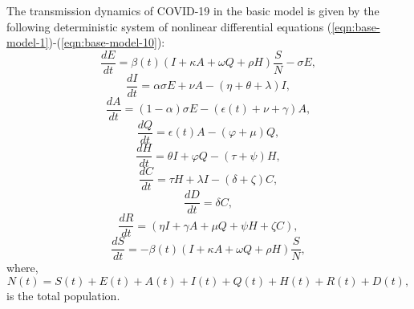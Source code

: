 \documentclass[fleqn,10pt]{wlscirep}
\begin{document}
The transmission dynamics of COVID-19 in the basic model is given by the following deterministic system of nonlinear differential equations (\ref{eqn:base-model-1})-(\ref{eqn:base-model-10}):
\begin{equation}
\frac{dE}{dt} = \beta(t) \left( I + \kappa A + \omega Q + \rho H \right) \frac{S}{N} - \sigma E, 
\label{eqn:base-model-1}
\end{equation}
\begin{equation}
\frac{dI}{dt} = \alpha \sigma E + \nu A - \left( \eta + \theta + \lambda \right) I,
\label{eqn:base-model-2}
\end{equation}
\begin{equation}
\frac{dA}{dt} =  \left( 1-\alpha \right) \sigma E - \left( \epsilon(t) + \nu + \gamma \right) A,
\label{eqn:base-model-3}
\end{equation}
\begin{equation}
\frac{dQ}{dt} = \epsilon(t) A - \left( \varphi + \mu \right) Q,
\label{eqn:base-model-4}
\end{equation}
\begin{equation}
\frac{dH}{dt} = \theta I + \varphi Q - \left( \tau + \psi \right) H ,
\label{eqn:base-model-5}
\end{equation}
\begin{equation}
\frac{dC}{dt} =  \tau H + \lambda I - \left( \delta + \zeta \right) C,
\label{eqn:base-model-6}
\end{equation}
\begin{equation}
\frac{dD}{dt} =  \delta C,
\label{eqn:base-model-7}
\end{equation}
\begin{equation}
\frac{dR}{dt} =  \left( \eta I +  \gamma A + \mu Q + \psi H + \zeta C \right),
\label{eqn:base-model-8}
\end{equation}
\begin{equation}
\frac{dS}{dt} = -\beta(t) \left( I + \kappa A + \omega Q + \rho H \right) \frac{S}{N},
\label{eqn:base-model-9}
\end{equation}
where,
\begin{equation}
N(t) = S(t) + E(t) + A(t) + I(t) + Q(t) + H(t) + R(t) + D(t),
\label{eqn:base-model-10}
\end{equation}
is the total population. 
\end{document}
